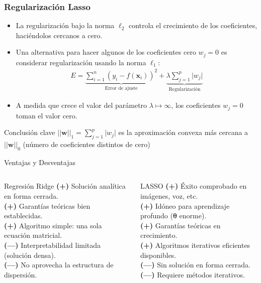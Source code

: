 \documentclass[aspectratio=169, 10pt]{beamer}
\begin{document}
\begin{frame}
\frametitle{Regularizaci\'on Lasso}
\begin{itemize}
	\item La regularizaci\'on bajo la norma $\ell_2$ controla el crecimiento de los coeficientes, haciéndolos cercanos a cero.  
	\pause
	\item Una alternativa para hacer algunos de los coeficientes cero  $w_j=0$ es considerar regularizaci\'on usando la norma $\ell_1$:
	\begin{align*}
		E=\underbrace{\sum_{i=1}^n (y_i-f(\mathbf x_i))^2}_{\text{Error de ajuste}} + \underbrace{\lambda \sum_{j=1}^p \vert w_j \vert }_{\text{Regularización}}
	\end{align*}
	\pause
	\item A medida que crece el valor del par\'ametro $\lambda \mapsto \infty$, los coeficientes $w_j = 0$ toman el valor cero.

	
\end{itemize}
		\begin{alertblock}{Conclusión clave}
$||\bm{w}||_1=\sum_{j=1}^p \vert w_j \vert$ es la aproximación convexa más cercana a $||\bm{w}||_0$ (número de coeficientes distintos de cero)
\end{alertblock}
\end{frame}

\begin{frame}{Ventajas y Desventajas}
	\begin{columns}[t]
		\begin{block}{Regresión Ridge}
			\textcolor{green!60!black}{\textbf{(+)}} Solución analítica en forma cerrada. \\
			\textcolor{green!60!black}{\textbf{(+)}} Garantías teóricas bien establecidas. \\
			\textcolor{green!60!black}{\textbf{(+)}} Algoritmo simple: una sola ecuación matricial. \\[4pt]
			\textcolor{red!70!black}{\textbf{(---)}} Interpretabilidad limitada (solución densa). \\
			\textcolor{red!70!black}{\textbf{(---)}} No aprovecha la estructura de dispersión.
		\end{block}
		
		\begin{block}{LASSO}
			\textcolor{green!60!black}{\textbf{(+)}} Éxito comprobado en imágenes, voz, etc. \\
			\textcolor{green!60!black}{\textbf{(+)}} Idóneo para aprendizaje profundo ($\bm\theta$ enorme). \\
			\textcolor{green!60!black}{\textbf{(+)}} Garantías teóricas en crecimiento. \\
			\textcolor{green!60!black}{\textbf{(+)}} Algoritmos iterativos eficientes disponibles. \\[4pt]
			\textcolor{red!70!black}{\textbf{(---)}} Sin solución en forma cerrada. \\
			\textcolor{red!70!black}{\textbf{(---)}} Requiere métodos iterativos.
		\end{block}
	\end{columns}
\end{frame}
\end{document}
